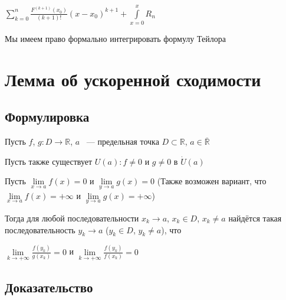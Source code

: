 \documentclass{article}
\begin{document}
			$\sum\limits^n_{k = 0} \frac{F^{(k + 1)} (x_0)}{(k + 1)!} (x - x_0)^{k + 1} + \int\limits^x_{x = 0} R_n$

			Мы имеем право формально интегрировать формулу Тейлора

	\newpage

	\section{Лемма об ускоренной сходимости}
	
		\subsection{Формулировка}
		
			Пусть $f$, $g : D \rightarrow \mathbb{R}$, $a$ ~--- предельная точка $D \subset \mathbb{R}$, $a \in \overline{\mathbb{R}}$
		
			Пусть также существует $U(a) : f \neq 0$ и $g \neq 0$ в $\dot{U}(a)$
		
			Пусть $\lim\limits_{x \rightarrow a} f(x) = 0$ и $\lim\limits_{y \rightarrow a} g(x) = 0$ (Также возможен вариант, что $\lim\limits_{x \rightarrow a} f(x) = + \infty$ и $\lim\limits_{y \rightarrow a} g(x) = +\infty$)
			
			Тогда для любой последовательности $x_k \rightarrow a$, $x_k \in D$, $x_k \neq a$ найдётся такая последовательность $y_k \rightarrow a$ ($y_k \in D$, $y_k \neq a$), что 
			
			$\lim\limits_{k \rightarrow +\infty} \frac{f(y_k)}{g(x_k)} = 0$ и $\lim\limits_{k \rightarrow +\infty} \frac{f(y_k)}{f(x_k)} = 0$
			
		\subsection{Доказательство}
		
\end{document}
